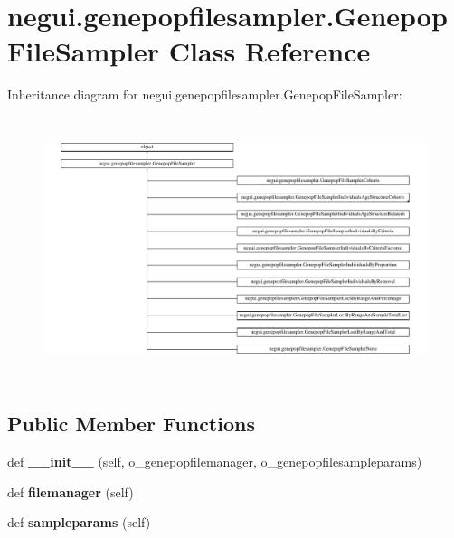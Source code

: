 \hypertarget{classnegui_1_1genepopfilesampler_1_1GenepopFileSampler}{}\section{negui.\+genepopfilesampler.\+Genepop\+File\+Sampler Class Reference}
\label{classnegui_1_1genepopfilesampler_1_1GenepopFileSampler}
Inheritance diagram for negui.\+genepopfilesampler.\+Genepop\+File\+Sampler\+:\begin{figure}[H]
\begin{center}
\leavevmode
\includegraphics[height=7.711864cm]{classnegui_1_1genepopfilesampler_1_1GenepopFileSampler}
\end{center}
\end{figure}
\subsection*{Public Member Functions}
\begin{DoxyCompactItemize}
\item 
def {\bfseries \+\_\+\+\_\+init\+\_\+\+\_\+} (self, o\+\_\+genepopfilemanager, o\+\_\+genepopfilesampleparams)\hypertarget{classnegui_1_1genepopfilesampler_1_1GenepopFileSampler_abcaee019cd11b009568dde7fa2e94341}{}\label{classnegui_1_1genepopfilesampler_1_1GenepopFileSampler_abcaee019cd11b009568dde7fa2e94341}

\item 
def {\bfseries filemanager} (self)\hypertarget{classnegui_1_1genepopfilesampler_1_1GenepopFileSampler_a58431ed64951ef4a3cf813c9ee2624b3}{}\label{classnegui_1_1genepopfilesampler_1_1GenepopFileSampler_a58431ed64951ef4a3cf813c9ee2624b3}

\item 
def {\bfseries sampleparams} (self)\hypertarget{classnegui_1_1genepopfilesampler_1_1GenepopFileSampler_ad48f60ff378a777538a886b058eb0e00}{}\label{classnegui_1_1genepopfilesampler_1_1GenepopFileSampler_ad48f60ff378a777538a886b058eb0e00}

\end{DoxyCompactItemize}


